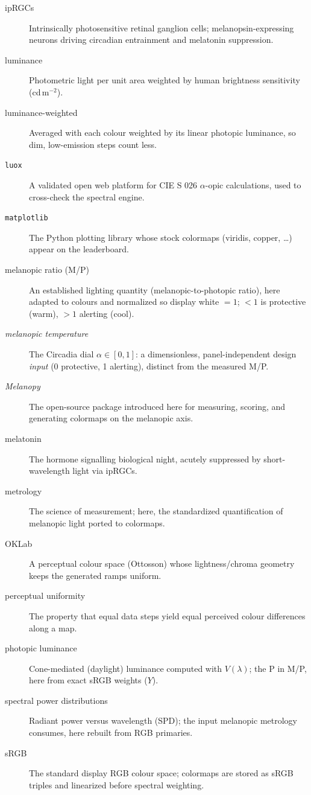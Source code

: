 \documentclass[10pt,a4paper,twocolumn]{article}
\begin{document}
\begin{description}
\item[ipRGCs] Intrinsically photosensitive retinal ganglion cells; melanopsin-expressing neurons driving circadian entrainment and melatonin suppression.
\item[luminance] Photometric light per unit area weighted by human brightness sensitivity (cd\,m$^{-2}$).
\item[luminance-weighted] Averaged with each colour weighted by its linear photopic luminance, so dim, low-emission steps count less.
\item[\texttt{luox}] A validated open web platform for CIE S 026 $\alpha$-opic calculations, used to cross-check the spectral engine.
\item[\texttt{matplotlib}] The Python plotting library whose stock colormaps (viridis, copper, \ldots) appear on the leaderboard.
\item[melanopic ratio (M/P)] An established lighting quantity (melanopic-to-photopic ratio), here adapted to colours and normalized so display white $=1$; $<1$ is protective (warm), $>1$ alerting (cool).
\item[\textit{melanopic temperature}] The Circadia dial $\alpha \in [0,1]$: a dimensionless, panel-independent design \emph{input} (0 protective, 1 alerting), distinct from the measured M/P.
\item[\textit{Melanopy}] The open-source package introduced here for measuring, scoring, and generating colormaps on the melanopic axis.
\item[melatonin] The hormone signalling biological night, acutely suppressed by short-wavelength light via ipRGCs.
\item[metrology] The science of measurement; here, the standardized quantification of melanopic light ported to colormaps.
\item[OKLab] A perceptual colour space (Ottosson) whose lightness/chroma geometry keeps the generated ramps uniform.
\item[perceptual uniformity] The property that equal data steps yield equal perceived colour differences along a map.
\item[photopic luminance] Cone-mediated (daylight) luminance computed with $V(\lambda)$; the P in M/P, here from exact sRGB weights ($Y$).
\item[spectral power distributions] Radiant power versus wavelength (SPD); the input melanopic metrology consumes, here rebuilt from RGB primaries.
\item[sRGB] The standard display RGB colour space; colormaps are stored as sRGB triples and linearized before spectral weighting.
\end{description}
\endgroup

\raggedbottom
\printbibliography
\end{document}
